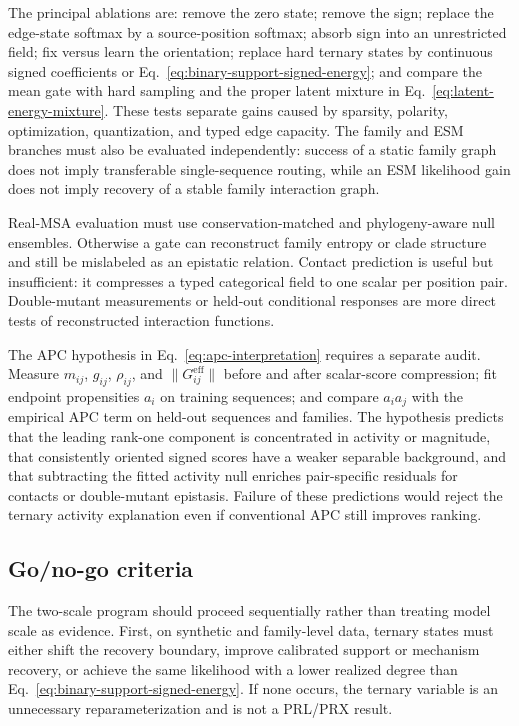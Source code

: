 \documentclass[10pt,twocolumn]{article}
\newcommand{\1}{\mathbf 1}
\theoremstyle{remark}
\begin{document}
The principal ablations are: remove the zero state; remove the sign; replace the edge-state
softmax by a source-position softmax; absorb sign into an unrestricted field; fix versus learn the
orientation; replace hard ternary states by continuous signed coefficients or
Eq.~\ref{eq:binary-support-signed-energy}; and compare the mean gate with hard sampling and the
proper latent mixture in Eq.~\ref{eq:latent-energy-mixture}.  These tests
separate gains caused by sparsity, polarity, optimization, quantization, and typed edge capacity.
The family and ESM branches must also be evaluated independently: success of a static family graph
does not imply transferable single-sequence routing, while an ESM likelihood gain does not imply
recovery of a stable family interaction graph.

Real-MSA evaluation must use conservation-matched and phylogeny-aware null ensembles.  Otherwise a
gate can reconstruct family entropy or clade structure and still be mislabeled as an epistatic
relation.  Contact prediction is useful but insufficient: it compresses a typed categorical field
to one scalar per position pair.  Double-mutant measurements or held-out conditional responses are
more direct tests of reconstructed interaction functions.

The APC hypothesis in Eq.~\ref{eq:apc-interpretation} requires a separate audit.  Measure
$m_{ij}$, $g_{ij}$, $\rho_{ij}$, and $\|G_{ij}^{\mathrm{eff}}\|$ before and after scalar-score
compression; fit endpoint propensities $a_i$ on training sequences; and compare $a_i a_j$ with the
empirical APC term on held-out sequences and families.  The hypothesis predicts that the leading
rank-one component is concentrated in activity or magnitude, that consistently oriented signed
scores have a weaker separable background, and that subtracting the fitted activity null enriches
pair-specific residuals for contacts or double-mutant epistasis.  Failure of these predictions
would reject the ternary activity explanation even if conventional APC still improves ranking.

\subsection{Go/no-go criteria}

The two-scale program should proceed sequentially rather than treating model scale as evidence.
First, on synthetic and family-level data, ternary states must either shift the recovery boundary,
improve calibrated support or mechanism recovery, or achieve the same likelihood with a lower
realized degree than Eq.~\ref{eq:binary-support-signed-energy}.  If none occurs, the ternary
variable is an unnecessary reparameterization and is not a PRL/PRX result.
\end{document}
